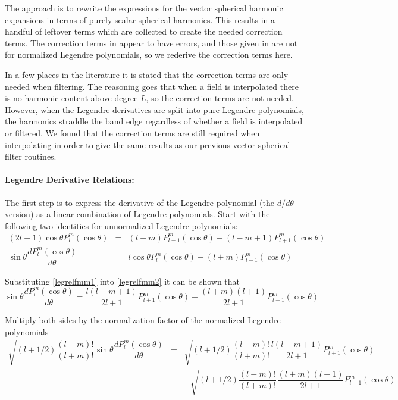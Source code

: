 The approach is to rewrite the expressions for the vector spherical harmonic expansions in terms of purely scalar spherical harmonics. This results in a handful of leftover terms which are collected to create the needed correction terms. The correction terms in \cite{yucel2008helmholtz} appear to have errors, and those given in \cite{shanker2003fast} are not for normalized Legendre polynomials, so we rederive the correction terms here.  

In a few places in the literature it is stated that the correction terms are only needed when filtering. The reasoning goes that when a field is interpolated there is no harmonic content above degree $L$, so the correction terms are not needed. However, when the Legendre derivatives are split into pure Legendre polynomials, the harmonics straddle the band edge regardless of whether a field is interpolated or filtered. We found that the correction terms are still required when interpolating in order to give the same results as our previous vector spherical filter routines.


\paragraph{Legendre Derivative Relations:}

The first step is to express the derivative of the Legendre polynomial (the $d/d\theta$ version) as a linear combination of Legendre polynomials.  Start with the following two identities for unnormalized Legendre polynomials:
\begin{eqnarray}
(2l+1)\cos\theta P_l^m(\cos\theta) &=& (l+m)P_{l-1}^m(\cos\theta) + (l-m+1)P_{l+1}^m(\cos\theta) \label{legrelfmm1} \\
\sin\theta \dfrac{dP_l^m(\cos\theta)}{d\theta} &=& l\cos\theta P_l^m(\cos\theta) - (l+m)P_{l-1}^m(\cos\theta) \label{legrelfmm2} 
\end{eqnarray}

Substituting \eqref{legrelfmm1} into \eqref{legrelfmm2} it can be shown that
\begin{equation}
\sin\theta \dfrac{dP_l^m(\cos\theta)}{d\theta}  = \dfrac{l(l-m+1)}{2l+1}P_{l+1}^m(\cos\theta) - \dfrac{(l+m)(l+1)}{2l+1}P_{l-1}^m(\cos\theta)
\end{equation}

Multiply both sides by the normalization factor of the normalized Legendre polynomials
\begin{eqnarray}
\sqrt{(l + 1/2)\dfrac{(l-m)!}{(l+m)!}}\sin\theta \dfrac{dP_l^m(\cos\theta)}{d\theta} & =& \sqrt{(l + 1/2)\dfrac{(l-m)!}{(l+m)!}}\dfrac{l(l-m+1)}{2l+1}P_{l+1}^m(\cos\theta) \nonumber \\ 
\ & \  & - \sqrt{(l + 1/2)\dfrac{(l-m)!}{(l+m)!}}\dfrac{(l+m)(l+1)}{2l+1}P_{l-1}^m(\cos\theta) \nonumber \\
\end{eqnarray}

